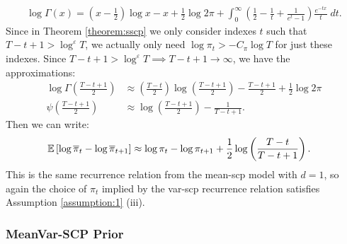 \begin{align*}
    \log \Gamma(x) = \left(x - \frac{1}{2}\right) \log x - x + \frac{1}{2} \log 2 \pi + \int_{0}^\infty\left(\frac{1}{2} - \frac{1}{t} + \frac{1}{e^t - 1} \right)\frac{e^{-tx}}{t} \;dt.
\end{align*}
Since in Theorem \ref{theorem:sscp} we only consider indexes $t$ such that $T-t+1 > \log^{\varepsilon} T$, we actually only need $\log \pi_t > -C_\pi \log T$ for just these indexes. Since $T-t+1 > \log^{\varepsilon} T \implies T-t+1 \to \infty$, we have the approximations:
\begin{align*}
    \log \Gamma\left(\frac{T-t+1}{2}\right) &\approx \left(\frac{T-t}{2}\right)\log\left(\frac{T - t +1}{2}\right) - \frac{T - t +1}{2} +\frac{1}{2} \log 2 \pi \\
    \psi\left(\frac{T-t+1}{2}\right)  &\approx \log \left(\frac{T-t+1}{2}\right) - \frac{1}{T-t+1}.
\end{align*}
Then we can write:
\begin{align*}
    \mathbb{E}\left[\log\overline{\pi}_t - \log \overline{\pi}_{t+1} \right] &\approx \log \pi_t- \log \pi_{t+1} + \frac{1}{2}\log\left(\frac{T - t}{T-t+1}\right).
\end{align*}
This is the same recurrence relation from the mean-scp model with $d=1$, so again the choice of $\pi_t$ implied by the var-scp recurrence relation satisfies Assumption \ref{assumption:1} (iii).

\subsubsection{MeanVar-SCP Prior}

